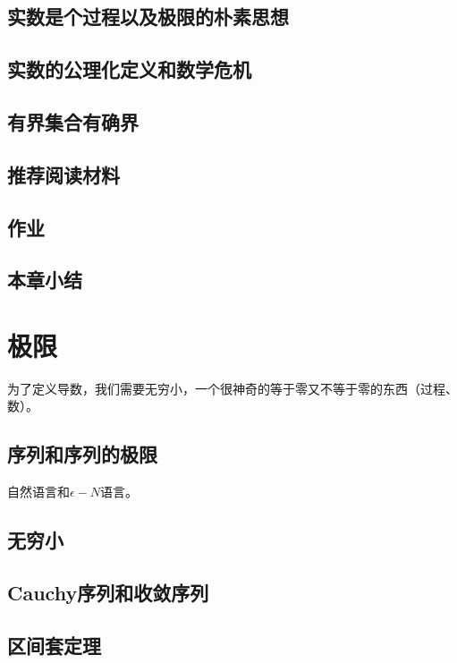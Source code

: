 \documentclass{ctexbook}
\newcommand{\ChapLabel}[1]{\label{#1}}
\begin{document}
\section{实数是个过程以及极限的朴素思想}

\section{实数的公理化定义和数学危机}

\section{有界集合有确界}

\section{推荐阅读材料}

\section{作业}


\section{本章小结}

\chapter{极限}
\ChapLabel{Chap:Limit}
为了定义导数，我们需要无穷小，一个很神奇的等于零又不等于零的东西（过程、数）。

\section{序列和序列的极限}
自然语言和$\epsilon-N$语言。

\section{无穷小}

\section{Cauchy序列和收敛序列}

\section{区间套定理}
\end{document}
